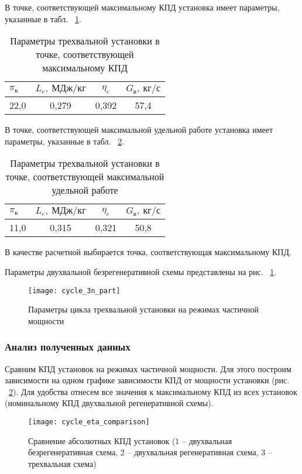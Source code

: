 В точке, соответствующей максимальному КПД установка имеет параметры, указанные в табл. ~\ref{tab:cycle_3n_max_eta}.

\begin{longtable}{|p{7cm}|c|c|c|}
	\caption{Параметры трехвальной установки в точке, соответствующей максимальному КПД}
	\label{tab:cycle_3n_max_eta}
	\hline
	\textbf{$\pi_к$} & \textbf{$L_e, \ МДж/кг$} & \textbf{$\eta_e$} & \textbf{$G_в, \ кг/с$} \\ \hline
	22,0 & 0,279 & 0,392 & 57,4 \\ \hline
\end{longtable}


В точке, соответствующей максимальной удельной работе установка имеет параметры, указанные в табл. ~\ref{tab:cycle_3n_max_labour}.
\begin{longtable}{|p{7cm}|c|c|c|}
	\caption{Параметры трехвальной установки в точке, соответствующей максимальной удельной работе}
	\label{tab:cycle_3n_max_labour}
	\hline
	\textbf{$\pi_к$} & \textbf{$L_e, \ МДж/кг$} & \textbf{$\eta_e$} & \textbf{$G_в, \ кг/с$} \\ \hline
	11,0 & 0,315 & 0,321 & 50,8 \\ \hline
\end{longtable}

В качестве расчетной выбирается точка, соответствующая максимальному КПД.

Параметры двухвальной безрегенеративной схемы представлены на рис. ~\ref{img:cycle_3n_part}.

\begin{figure}[H]
	\centering
	\texttt{[image: cycle\_3n\_part]}
	\caption{Параметры цикла трехвальной установки на режимах частичной мощности}
	\label{img:cycle_3n_part}
\end{figure}

\subsubsection{Анализ полученных данных}
Сравним КПД установок на режимах частичной мощности. Для этого построим зависимости на одном графике зависимости КПД от мощности установки (рис. ~\ref{img:cycle_eta_comparison}). Для удобства отнесем все значения к максимальному КПД из всех установок (номинальному КПД двухвальной регенеративной схемы).

\begin{figure}[H]
	\centering
	\texttt{[image: cycle\_eta\_comparison]}
	\caption{Сравнение абсолютных КПД установок (1 – двухвальная безрегенеративная схема, 2 – двухвальная регенеративная схема, 3 – трехвальная схема)}
	\label{img:cycle_eta_comparison}
\end{figure}

